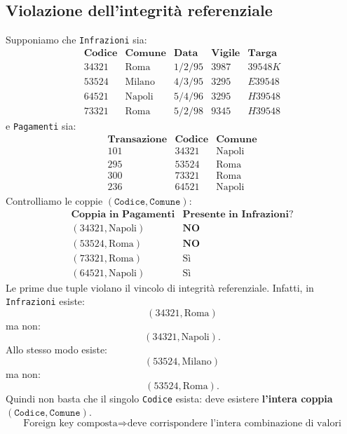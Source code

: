
\subsection{Violazione dell'integrità referenziale}
Supponiamo che \texttt{Infrazioni} sia:
\[
\begin{array}{c|c|c|c|c}
\textbf{Codice} & \textbf{Comune} & \textbf{Data} &
\textbf{Vigile} & \textbf{Targa} \\ \hline
34321 & \text{Roma}   & 1/2/95 & 3987 & 39548K \\
53524 & \text{Milano} & 4/3/95 & 3295 & E39548 \\
64521 & \text{Napoli} & 5/4/96 & 3295 & H39548 \\
73321 & \text{Roma}   & 5/2/98 & 9345 & H39548
\end{array}
\]
e \texttt{Pagamenti} sia:
\[
\begin{array}{c|c|c}
\textbf{Transazione} & \textbf{Codice} & \textbf{Comune} \\ \hline
101 & 34321 & \text{Napoli} \\
295 & 53524 & \text{Roma} \\
300 & 73321 & \text{Roma} \\
236 & 64521 & \text{Napoli}
\end{array}
\]
Controlliamo le coppie $(\texttt{Codice},\texttt{Comune})$:
\[
\begin{array}{c|c}
\textbf{Coppia in Pagamenti} & \textbf{Presente in Infrazioni?} \\ \hline
(34321,\text{Napoli}) & \textbf{NO} \\
(53524,\text{Roma})   & \textbf{NO} \\
(73321,\text{Roma})   & \text{Sì} \\
(64521,\text{Napoli}) & \text{Sì}
\end{array}
\]
Le prime due tuple violano il vincolo di integrità referenziale.
Infatti, in \texttt{Infrazioni} esiste:
\[
(34321,\text{Roma})
\]
ma non:
\[
(34321,\text{Napoli}).
\]
Allo stesso modo esiste:
\[
(53524,\text{Milano})
\]
ma non:
\[
(53524,\text{Roma}).
\]
Quindi non basta che il singolo \texttt{Codice} esista:
deve esistere \textbf{l'intera coppia} $(\texttt{Codice},\texttt{Comune})$.
\[
\boxed{
\text{Foreign key composta}
\Rightarrow
\text{deve corrispondere l'intera combinazione di valori}
}
\]

